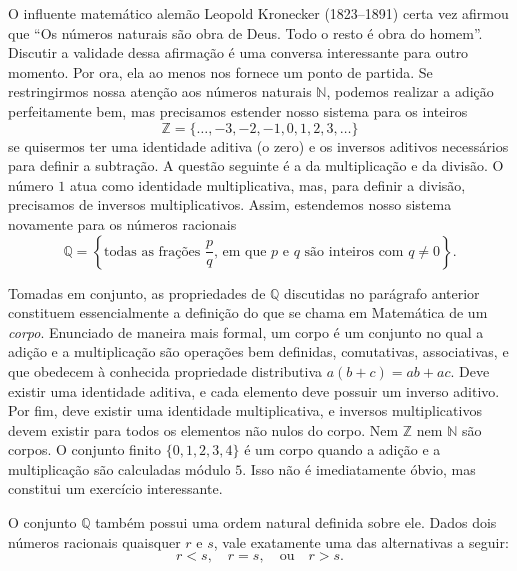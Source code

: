 O influente matemático alemão Leopold Kronecker (1823--1891) certa vez afirmou que ``Os números naturais são obra de Deus. Todo o resto é obra do homem''. Discutir a validade dessa afirmação é uma conversa interessante para outro momento. Por ora, ela ao menos nos fornece um ponto de partida. Se restringirmos nossa atenção aos números naturais $\mathbb{N}$, podemos realizar a adição perfeitamente bem, mas precisamos estender nosso sistema para os inteiros 
\[
\mathbb{Z} = \{\dots, -3, -2, -1, 0, 1, 2, 3, \dots\}
\]
se quisermos ter uma identidade aditiva (o zero) e os inversos aditivos necessários para definir a subtração. A questão seguinte é a da multiplicação e da divisão. O número $1$ atua como identidade multiplicativa, mas, para definir a divisão, precisamos de inversos multiplicativos. Assim, estendemos nosso sistema novamente para os números racionais 
\[
\mathbb{Q} = \left\{ \text{todas as frações } \frac{p}{q} \text{, em que } p \text{ e } q \text{ são inteiros com } q \neq 0 \right\}.
\]

Tomadas em conjunto, as propriedades de $\mathbb{Q}$ discutidas no parágrafo 
anterior constituem essencialmente a definição do que se chama em Matemática de um \textit{corpo}.
Enunciado de maneira mais formal, um corpo é um conjunto no qual a adição 
e a multiplicação são operações bem definidas, comutativas, associativas, 
e que obedecem à conhecida propriedade distributiva $a(b + c) = ab + ac$. 
Deve existir uma identidade aditiva, e cada elemento deve possuir um inverso aditivo. 
Por fim, deve existir uma identidade multiplicativa, e inversos 
multiplicativos devem existir para todos os elementos não nulos do corpo. 
Nem $\mathbb{Z}$ nem $\mathbb{N}$ são corpos. O conjunto finito 
$\{0, 1, 2, 3, 4\}$ é um corpo quando a adição e a multiplicação 
são calculadas módulo $5$. Isso não é imediatamente óbvio, 
mas constitui um exercício interessante. 

O conjunto $\mathbb{Q}$ também possui uma ordem natural definida sobre ele. Dados dois números racionais quaisquer $r$ e $s$, vale exatamente uma das alternativas a seguir:
\[
r < s, \quad r = s, \quad \text{ou} \quad r > s.
\]

